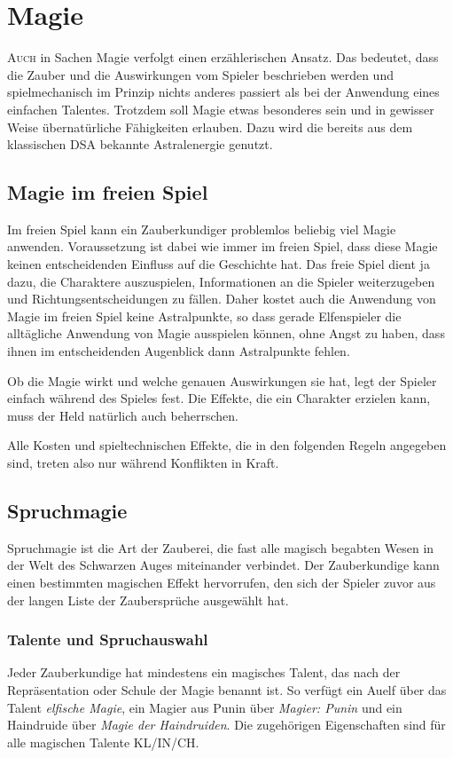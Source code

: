 \chapter{Magie}\label{Ch:Magie}


\lettrine{A}{uch} in Sachen Magie verfolgt \StoryDSA einen erzählerischen Ansatz. Das bedeutet, dass die Zauber und die Auswirkungen vom Spieler beschrieben werden und spielmechanisch im Prinzip nichts anderes passiert als bei der Anwendung eines einfachen Talentes. Trotzdem soll Magie etwas besonderes sein und in gewisser Weise übernatürliche Fähigkeiten erlauben. Dazu wird die bereits aus dem klassischen DSA bekannte Astralenergie genutzt.

\BN
\section{Magie im freien Spiel}
Im freien Spiel kann ein Zauberkundiger problemlos beliebig viel Magie anwenden. Voraussetzung ist dabei wie immer im freien Spiel, dass diese Magie keinen entscheidenden Einfluss auf die Geschichte hat. Das freie Spiel dient ja dazu, die Charaktere auszuspielen, Informationen an die Spieler weiterzugeben und Richtungsentscheidungen zu fällen. Daher kostet auch die Anwendung von Magie im freien Spiel keine Astralpunkte, so dass gerade Elfenspieler die alltägliche Anwendung von Magie ausspielen können, ohne Angst zu haben, dass ihnen im entscheidenden Augenblick dann Astralpunkte fehlen.

Ob die Magie wirkt und welche genauen Auswirkungen sie hat, legt der Spieler einfach während des Spieles fest. Die Effekte, die ein Charakter erzielen kann, muss der Held natürlich auch beherrschen.

Alle Kosten und spieltechnischen Effekte, die in den folgenden Regeln angegeben sind, treten also nur während Konflikten in Kraft.

\section{Spruchmagie}
Spruchmagie ist die Art der Zauberei, die fast alle magisch begabten Wesen in der Welt des Schwarzen Auges miteinander verbindet. Der Zauberkundige kann einen bestimmten magischen Effekt hervorrufen, den sich der Spieler zuvor aus der langen Liste der Zaubersprüche ausgewählt hat.
\EN

\subsection{Talente und Spruchauswahl}
Jeder Zauberkundige hat mindestens ein magisches Talent, das nach der Repräsentation oder Schule der Magie benannt ist. So verfügt ein Auelf über das Talent \emph{elfische Magie}, ein Magier aus Punin über \emph{Magier: Punin} und ein Haindruide über \emph{Magie der Haindruiden}. Die zugehörigen Eigenschaften sind für alle magischen Talente KL/IN/CH.

